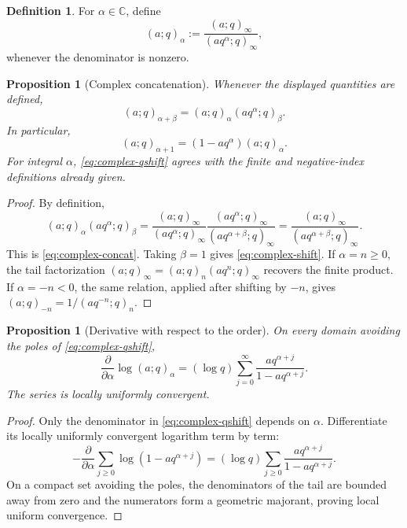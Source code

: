 \documentclass[11pt,oneside,openany]{book}
\newtheorem{proposition}[theorem]{Proposition}
\theoremstyle{definition}
\newtheorem{definition}[theorem]{Definition}
\theoremstyle{remark}
\newcommand{\C}{\mathbb C}
\begin{document}
\begin{definition}\label{def:complex-qshift}
For $\alpha\in\C$, define
\[
 (a;q)_\alpha
 :=\frac{(a;q)_\infty}{(aq^\alpha;q)_\infty},
 \tag{1.1}\label{eq:complex-qshift}
\]
whenever the denominator is nonzero.
\end{definition}

\begin{proposition}[Complex concatenation]\label{prop:complex-concat}
Whenever the displayed quantities are defined,
\[
 (a;q)_{\alpha+\beta}
 =(a;q)_\alpha(aq^\alpha;q)_\beta.
 \tag{1.2}\label{eq:complex-concat}
\]
In particular,
\[
 (a;q)_{\alpha+1}=(1-aq^\alpha)(a;q)_\alpha.
 \tag{1.3}\label{eq:complex-shift}
\]
For integral $\alpha$, \eqref{eq:complex-qshift} agrees with the finite and negative-index definitions already given.
\end{proposition}

\begin{proof}
By definition,
\[
 (a;q)_\alpha(aq^\alpha;q)_\beta
 =\frac{(a;q)_\infty}{(aq^\alpha;q)_\infty}
  \frac{(aq^\alpha;q)_\infty}{(aq^{\alpha+\beta};q)_\infty}
 =\frac{(a;q)_\infty}{(aq^{\alpha+\beta};q)_\infty}.
\]
This is \eqref{eq:complex-concat}.  Taking $\beta=1$ gives \eqref{eq:complex-shift}.  If $\alpha=n\ge0$, the tail factorization
\(
 (a;q)_\infty=(a;q)_n(aq^n;q)_\infty
\)
recovers the finite product.  If $\alpha=-n<0$, the same relation, applied after shifting by $-n$, gives
\(
 (a;q)_{-n}=1/(aq^{-n};q)_n.
\)
\end{proof}

\begin{proposition}[Derivative with respect to the order]\label{prop:order-derivative}
On every domain avoiding the poles of \eqref{eq:complex-qshift},
\[
 \frac{\partial}{\partial\alpha}\log(a;q)_\alpha
 =(\log q)\sum_{j=0}^{\infty}
 \frac{aq^{\alpha+j}}{1-aq^{\alpha+j}}.
 \tag{1.4}\label{eq:order-derivative}
\]
The series is locally uniformly convergent.
\end{proposition}

\begin{proof}
Only the denominator in \eqref{eq:complex-qshift} depends on $\alpha$.  Differentiate its locally uniformly convergent logarithm term by term:
\[
 -\frac{\partial}{\partial\alpha}
 \sum_{j\ge0}\log(1-aq^{\alpha+j})
 =(\log q)\sum_{j\ge0}
 \frac{aq^{\alpha+j}}{1-aq^{\alpha+j}}.
\]
On a compact set avoiding the poles, the denominators of the tail are bounded away from zero and the numerators form a geometric majorant, proving local uniform convergence.
\end{proof}
\end{document}
